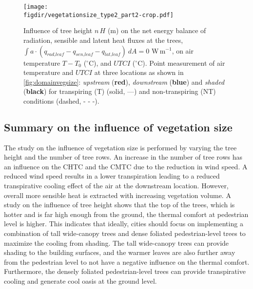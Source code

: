	\begin{sidewaysfigure}[p]
	\centering
	\texttt{[image: \\figdir/vegetationsize\_type2\_part2-crop.pdf]}
	\caption{Influence of tree height $n\,H$ (m) on  the net energy balance of radiation, sensible and latent heat fluxes at the trees, $\int a \cdot (q_{\textit{rad,leaf}}-q_{\textit{sen,leaf}}-q_{\textit{lat,leaf}})\ dA = 0$ W\,m$^{-1}$,  on air temperature $T-T_0$ ($^{\circ}$C), and  $\textit{UTCI}$ ($^{\circ}$C). Point measurement of air temperature and $UTCI$ at three locations as shown in \cref{fig:domainvegsize}: \textit{upstream} ({\color{flatuidarkred}\textbf{red}}), \textit{downstream} ({\color{flatuidarkblue}\textbf{blue}}) and \textit{shaded} (\textbf{black}) for transpiring (T) (solid, ---) and non-transpiring (NT) conditions (dashed, - - -).}
	\label{fig:vegetationsizepart2}
	\end{sidewaysfigure}

\subsection{Summary on the influence of vegetation size}

The study on the influence of vegetation size is performed by varying the tree height and the number of tree rows. An increase in the number of tree rows has an influence on the CHTC and the CMTC due to the reduction in wind speed. A reduced wind speed results in a lower transpiration leading to a reduced transpirative cooling effect of the air at the downstream location. However, overall more sensible heat is extracted with increasing vegetation volume. A study on the influence of tree height shows that the top of the trees, which is hotter and is far high enough from the ground, the thermal comfort at pedestrian level is higher. This indicates that ideally, cities should focus on implementing a combination of tall wide-canopy trees and dense foliated pedestrian-level trees to maximize the cooling from shading. The tall wide-canopy trees can provide shading to the building surfaces, and the warmer leaves are also further away from the pedestrian level to not have a negative influence on the thermal comfort. Furthermore, the densely foliated pedestrian-level trees can provide transpirative cooling and generate cool oasis at the ground level. 


